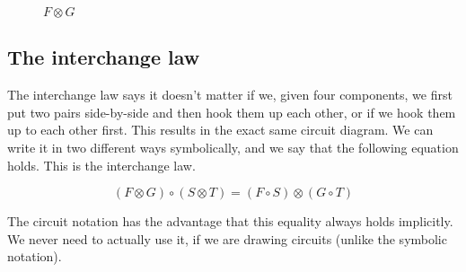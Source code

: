 \documentclass[runningheads]{llncs}
\begin{document}
\begin{figure}[h]
  \centering
\begin{minipage}{.5\textwidth}
    \centering
{}
\end{minipage}
  \caption{$F \otimes G$}
\end{figure}

\subsection{The interchange law}

The interchange law says it doesn't matter if we, given four components, we first put two pairs side-by-side and then
hook them up each other, or if we hook them up to each other first. This results in the exact same circuit diagram. We can
write it in two different ways symbolically, and we say that the following equation holds. This is the interchange law.

\[
  (F \otimes G) \circ (S \otimes T) = (F \circ S) \otimes (G \circ T)
\]

The circuit notation has the advantage that this equality always holds implicitly. We never need to actually use it, if we are
drawing circuits (unlike the symbolic notation).
\end{document}
